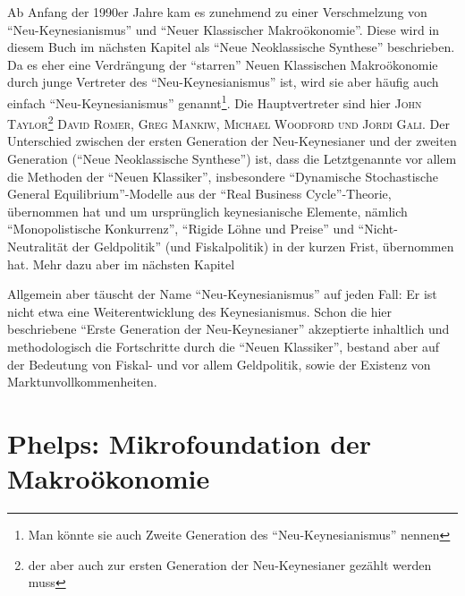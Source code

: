 Ab Anfang der 1990er Jahre kam es zunehmend zu einer Verschmelzung von "`Neu-Keynesianismus"' und "`Neuer Klassischer Makroökonomie"'. Diese wird in diesem Buch im nächsten Kapitel als "`Neue Neoklassische Synthese"' beschrieben. Da es eher eine Verdrängung der "`starren"' Neuen Klassischen Makroökonomie durch junge Vertreter des "`Neu-Keynesianismus"' ist, wird sie aber häufig auch einfach "`Neu-Keynesianismus"' genannt\footnote{Man könnte sie auch Zweite Generation des "`Neu-Keynesianismus"' nennen}. Die Hauptvertreter sind hier \textsc{John Taylor}\footnote{der aber auch zur ersten Generation der Neu-Keynesianer gezählt werden muss} \textsc{David Romer, Greg Mankiw, Michael Woodford und Jordi Gal\i}. Der Unterschied zwischen der ersten Generation der Neu-Keynesianer und der zweiten Generation ("`Neue Neoklassische Synthese"') ist, dass die Letztgenannte vor allem die Methoden der "`Neuen Klassiker"', insbesondere "`Dynamische Stochastische General Equilibrium"'-Modelle aus der "`Real Business Cycle"'-Theorie, übernommen hat und um ursprünglich keynesianische Elemente, nämlich "`Monopolistische Konkurrenz"', "`Rigide Löhne und Preise"' und "`Nicht-Neutralität der Geldpolitik"' (und Fiskalpolitik) in der kurzen Frist, übernommen hat. Mehr dazu aber im nächsten Kapitel

Allgemein aber täuscht der Name "`Neu-Keynesianismus"' auf jeden Fall: Er ist nicht etwa eine Weiterentwicklung des Keynesianismus. Schon die hier beschriebene "`Erste Generation der Neu-Keynesianer"' akzeptierte inhaltlich und methodologisch die Fortschritte durch die "`Neuen Klassiker"', bestand aber auf der Bedeutung von Fiskal- und vor allem Geldpolitik, sowie der Existenz von Marktunvollkommenheiten. 

\section{Phelps: Mikrofoundation der Makroökonomie}
\label{micmac}


